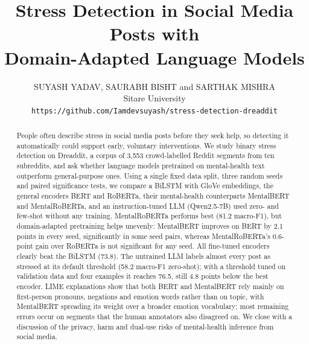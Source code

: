 \title[Stress Detection with Domain-Adapted Language Models]
      {Stress Detection in Social Media Posts with\\ Domain-Adapted Language Models}
\author[S. Yadav, S. Bisht and S. Mishra]
       {SUYASH YADAV, SAURABH BISHT and SARTHAK MISHRA\\
        Sitare University\\
        \texttt{https://github.com/Iamdevsuyash/stress-detection-dreaddit}}


\label{firstpage}
\maketitle

\begin{abstract}
People often describe stress in social media posts before they seek help, so detecting it
automatically could support early, voluntary interventions. We study binary stress detection on
Dreaddit, a corpus of 3,553 crowd-labelled Reddit segments from ten subreddits, and ask whether
language models pretrained on mental-health text outperform general-purpose ones. Using a single
fixed data split, three random seeds and paired significance tests, we compare a BiLSTM with GloVe
embeddings, the general encoders BERT and RoBERTa, their mental-health counterparts MentalBERT and
MentalRoBERTa, and an instruction-tuned LLM (Qwen2.5-7B) used zero- and few-shot without any training.
MentalRoBERTa performs best (81.2 macro-F1), but domain-adapted pretraining helps unevenly:
MentalBERT improves on BERT by 2.1 points in every seed, significantly in some seed pairs, whereas
MentalRoBERTa's 0.6-point gain over RoBERTa is not significant for any seed. All fine-tuned encoders
clearly beat the BiLSTM (73.8). The untrained LLM labels almost every post as stressed at its default
threshold (58.2 macro-F1 zero-shot); with a threshold tuned on validation data and four examples it
reaches 76.5, still 4.8 points below the best encoder. LIME explanations show that both BERT and MentalBERT rely
mainly on first-person pronouns, negations and emotion words rather than on topic, with MentalBERT
spreading its weight over a broader emotion vocabulary; most remaining errors occur on segments that
the human annotators also disagreed on. We close with a
discussion of the privacy, harm and dual-use risks of mental-health inference from social media.
\end{abstract}

